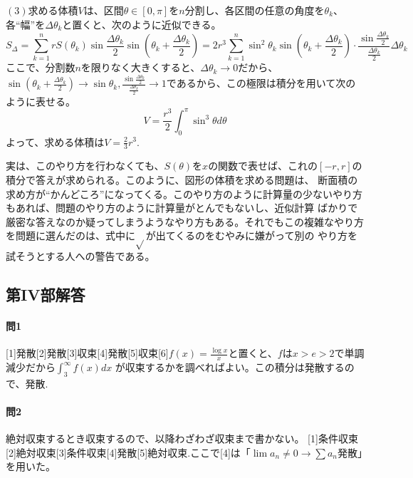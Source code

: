 \documentclass[a4j,dvipdfmx]{jsarticle}
\begin{document}
                        $(3)$求める体積$V$は、区間$\theta\in[0,\pi]$を$n$分割し、各区間の任意の角度を$\theta_k$、各``幅''を$\Delta \theta_k$と置くと、次のように近似できる。
                        \begin{equation*}
                            S_\Delta =\sum_{k=1}^{n}rS(\theta_k)\sin\frac{\Delta\theta_k}{2}\sin\left(\theta_k+\frac{\Delta\theta_k}{2}\right)=2r^3\sum_{k=1}^{n}\sin^2\theta_k \sin\left(\theta_k+\frac{\Delta \theta_k}{2}\right)\cdot \frac{\sin\frac{\Delta \theta_k}{2}}{\frac{\Delta\theta_k}{2}}\Delta \theta_k
                        \end{equation*}
                        ここで、分割数$n$を限りなく大きくすると、$\Delta \theta_k\to 0$だから、$\displaystyle \sin\left(\theta_k +\frac{\Delta\theta_k}{2}\right)\to\sin\theta_k,\frac{\sin\frac{\Delta \theta_k}{2}}{\frac{\Delta\theta_k}{2}}\to 1$であるから、この極限は積分を用いて次のように表せる。
                        \begin{equation*}
                            V=\frac{r^3}{2}\int_{0}^{\pi}\sin^3\theta d\theta
                        \end{equation*}
                        よって、求める体積は$V=\frac{2}{3}r^3.$

                        実は、このやり方を行わなくても、$S(\theta)$を$x$の関数で表せば、これの$[-r,r]$の積分で答えが求められる。このように、図形の体積を求める問題は、
                        断面積の求め方が``かんどころ''になってくる。このやり方のように計算量の少ないやり方もあれば、問題のやり方のように計算量がとんでもないし、近似計算
                        ばかりで厳密な答えなのか疑ってしまうようなやり方もある。それでもこの複雑なやり方を問題に選んだのは、式中に$\sqrt{}$が出てくるのをむやみに嫌がって別の
                        やり方を試そうとする人への警告である。
                \clearpage
                \subsection*{第IV部解答}
                    \paragraph{問1}[1]発散[2]発散[3]収束[4]発散[5]収束[6]$\displaystyle f(x)=\frac{\log x}{x}$と置くと、$f$は$x>e>2$で単調減少だから$\int_3^\infty f(x)dx $
                    が収束するかを調べればよい。この積分は発散するので、発散.

                    \paragraph{問2}
                    絶対収束するとき収束するので、以降わざわざ収束まで書かない。
                    [1]条件収束[2]絶対収束[3]条件収束[4]発散[5]絶対収束.\hspace{2mm}ここで[4]は「$\lim a_n\neq 0\rightarrow\sum a_n$発散」を用いた。
                
\end{document}
